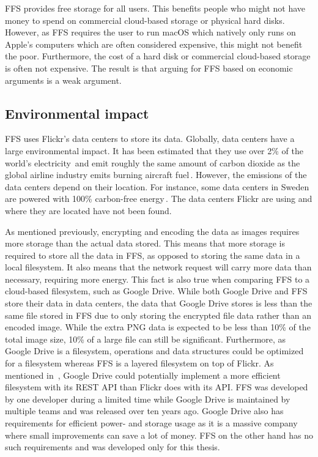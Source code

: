\gls{FFS} provides free storage for all users. This benefits people who might not have money to spend on commercial \mbox{cloud-based} storage or physical hard disks. However, as \gls{FFS} requires the user to run macOS which natively only runs on Apple's computers which are often considered expensive, this might not benefit the poor. Furthermore, the cost of a hard disk or commercial \mbox{cloud-based} storage is often not expensive. The result is that arguing for \gls{FFS} based on economic arguments is a weak argument.

\subsection{Environmental impact}
\label{subsec:imp_env}
\gls{FFS} uses Flickr's data centers to store its data. Globally, data centers have a large environmental impact. It has been estimated that they use over 2\% of the world's electricity\,\cite{mcleanDataCentersGenerate2020} and emit roughly the same amount of carbon dioxide as the global airline industry emits burning aircraft fuel\,\cite{pearceEnergyHogsCan}. However, the emissions of the data centers depend on their location. For instance, some data centers in Sweden are powered with 100\% carbon-free energy\,\cite{cappellaSwedenSustainableData2022,unfcccEcoDataCenterSwedenUNFCCC}. The data centers Flickr are using and where they are located have not been found.

As mentioned previously, encrypting and encoding the data as images requires more storage than the actual data stored. This means that more storage is required to store all the data in \gls{FFS}, as opposed to storing the same data in a local filesystem. It also means that the network request will carry more data than necessary, requiring more energy. This fact is also true when comparing \gls{FFS} to a \mbox{cloud-based} filesystem, such as Google Drive. While both Google Drive and \gls{FFS} store their data in data centers, the data that Google Drive stores is less than the same file stored in \gls{FFS} due to only storing the encrypted file data rather than an encoded image. While the extra PNG data is expected to be less than 10\% of the total image size, 10\% of a large file can still be significant. Furthermore, as Google Drive is a filesystem, operations and data structures could be optimized for a filesystem whereas \gls{FFS} is a layered filesystem on top of Flickr. As mentioned in~, Google Drive could potentially implement a more efficient filesystem with its REST \gls{API} than Flickr does with its \gls{API}. \gls{FFS} was developed by one developer during a limited time while Google Drive is maintained by multiple teams and was released over ten years ago. Google Drive also has requirements for efficient power- and storage usage as it is a massive company where small improvements can save a lot of money. \gls{FFS} on the other hand has no such requirements and was developed only for this thesis.


